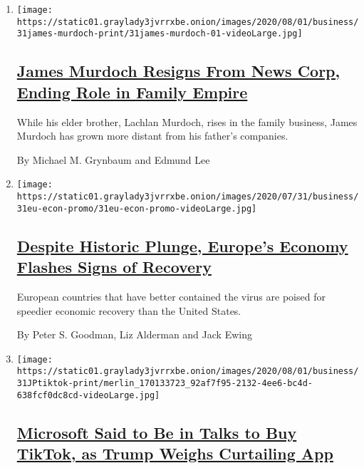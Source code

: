 \begin{enumerate}
\def\labelenumi{\arabic{enumi}.}
\item
  \texttt{[image: https://static01.graylady3jvrrxbe.onion/images/2020/08/01/business/31james-murdoch-print/31james-murdoch-01-videoLarge.jpg]}

  \hypertarget{james-murdoch-resigns-from-news-corp-ending-role-in-family-empire}{%
  \subsection{\texorpdfstring{\href{/2020/07/31/business/media/james-murdoch-resigns-news-corp.html}{James
  Murdoch Resigns From News Corp, Ending Role in Family
  Empire}}{James Murdoch Resigns From News Corp, Ending Role in Family Empire}}\label{james-murdoch-resigns-from-news-corp-ending-role-in-family-empire}}

  While his elder brother, Lachlan Murdoch, rises in the family
  business, James Murdoch has grown more distant from his father's
  companies.

  By Michael M. Grynbaum and Edmund Lee
\item
  \texttt{[image: https://static01.graylady3jvrrxbe.onion/images/2020/07/31/business/31eu-econ-promo/31eu-econ-promo-videoLarge.jpg]}

  \hypertarget{despite-historic-plunge-europes-economy-flashes-signs-of-recovery}{%
  \subsection{\texorpdfstring{\href{/2020/07/31/business/europe-economy-recovery-coronavirus.html}{Despite
  Historic Plunge, Europe's Economy Flashes Signs of
  Recovery}}{Despite Historic Plunge, Europe's Economy Flashes Signs of Recovery}}\label{despite-historic-plunge-europes-economy-flashes-signs-of-recovery}}

  European countries that have better contained the virus are poised for
  speedier economic recovery than the United States.

  By Peter S. Goodman, Liz Alderman and Jack Ewing
\item
  \texttt{[image: https://static01.graylady3jvrrxbe.onion/images/2020/08/01/business/31JPtiktok-print/merlin\_170133723\_92af7f95-2132-4ee6-bc4d-638fcf0dc8cd-videoLarge.jpg]}

  \hypertarget{microsoft-said-to-be-in-talks-to-buy-tiktok-as-trump-weighs-curtailing-app}{%
  \subsection{\texorpdfstring{\href{/2020/07/31/technology/tiktok-microsoft.html}{Microsoft
  Said to Be in Talks to Buy TikTok, as Trump Weighs Curtailing
  App}}{Microsoft Said to Be in Talks to Buy TikTok, as Trump Weighs Curtailing App}}\label{microsoft-said-to-be-in-talks-to-buy-tiktok-as-trump-weighs-curtailing-app}}


\end{enumerate}
